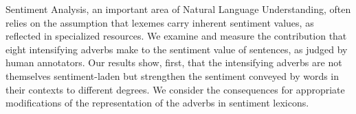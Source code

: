 Sentiment Analysis, an important area of Natural Language Understanding, often relies on the assumption that lexemes carry inherent sentiment values, as reflected in specialized resources. We examine and measure the contribution that eight intensifying adverbs make to the sentiment value of sentences, as judged by human annotators. Our results show, first, that the intensifying adverbs are not themselves sentiment-laden but strengthen the sentiment conveyed by words in their contexts to different degrees. We consider the consequences for appropriate modifications of the representation of the adverbs in sentiment lexicons.
